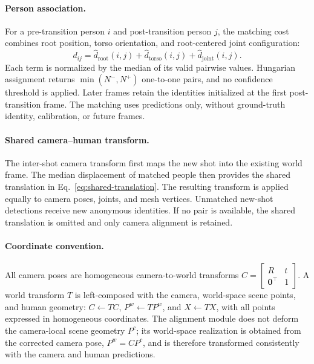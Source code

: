 \paragraph{Person association.}
For a pre-transition person $i$ and post-transition person $j$, the matching
cost combines root position, torso orientation, and root-centered joint
configuration:
\begin{equation}
 d_{ij}=\widehat d_{\mathrm{root}}(i,j)+
 \widehat d_{\mathrm{torso}}(i,j)+
 \widehat d_{\mathrm{joint}}(i,j).
\end{equation}
Each term is normalized by the median of its valid pairwise values. Hungarian
assignment returns $\min(N^-,N^+)$ one-to-one pairs, and no confidence
threshold is applied. Later frames retain the identities initialized at the
first post-transition frame. The matching uses predictions only, without
ground-truth identity, calibration, or future frames.

\paragraph{Shared camera--human transform.}
The inter-shot camera transform first maps the new shot into the existing world
frame. The median displacement of matched people then provides the shared
translation in Eq.~\ref{eq:shared-translation}. The resulting transform is
applied equally to camera poses, joints, and mesh vertices. Unmatched new-shot
detections receive new anonymous identities. If no pair is available, the
shared translation is omitted and only camera alignment is retained.

\paragraph{Coordinate convention.}
All camera poses are homogeneous camera-to-world transforms
$C=\begin{bmatrix}R&t\\\mathbf 0^\top&1\end{bmatrix}$. A world transform $T$
is left-composed with the camera, world-space scene points, and human geometry:
$C\leftarrow TC$, $P^w\leftarrow TP^w$, and $X\leftarrow TX$, with all points
expressed in homogeneous coordinates. The alignment module does not deform the
camera-local scene geometry $P^c$; its world-space realization is obtained from
the corrected camera pose, $P^w=CP^c$, and is therefore transformed consistently
with the camera and human predictions.

